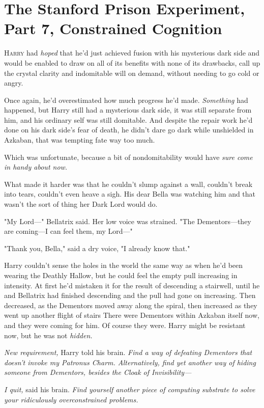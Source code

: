 \chapter{The Stanford Prison Experiment, Part 7, Constrained Cognition}

\lettrine{H}{arry} had
\emph{hoped} that he'd just achieved fusion with his mysterious dark side and
would be enabled to draw on all of its benefits with none of its drawbacks,
call up the crystal clarity and indomitable will on demand, without needing to
go cold or angry.

Once again, he'd overestimated how much progress he'd made. \emph{Something}
had happened, but Harry still had a mysterious dark side, it was still separate
from him, and his ordinary self was still domitable. And despite the repair
work he'd done on his dark side's fear of death, he didn't dare go dark while
unshielded in Azkaban, that was tempting fate way too much.

Which was unfortunate, because a bit of nondomitability would have \emph{sure
come in handy about now.}

What made it harder was that he couldn't slump against a wall, couldn't break
into tears, couldn't even heave a sigh. His dear Bella was watching him and
that wasn't the sort of thing her Dark Lord would do.

"My Lord—" Bellatrix said. Her low voice was strained. "The Dementors—they
are coming—I can feel them, my Lord—"

"Thank you, Bella," said a dry voice, "I already know that."

Harry couldn't sense the holes in the world the same way as when he'd been
wearing the Deathly Hallow, but he could feel the empty pull increasing in
intensity. At first he'd mistaken it for the result of descending a stairwell,
until he and Bellatrix had finished descending and the pull had gone on
increasing. Then decreased, as the Dementors moved away along the spiral, then
increased as they went up another flight of stairs{\el} There were Dementors
within Azkaban itself now, and they were coming for him. Of course they were.
Harry might be resistant now, but he was not \emph{hidden.}

\emph{New requirement,} Harry told his brain. \emph{Find a way of defeating
Dementors that doesn't invoke my Patronus Charm. Alternatively, find yet
another way of hiding someone from Dementors, besides the Cloak of
Invisibility—}

\emph{I quit,} said his brain. \emph{Find yourself another piece of computing
substrate to solve your ridiculously overconstrained problems.}

